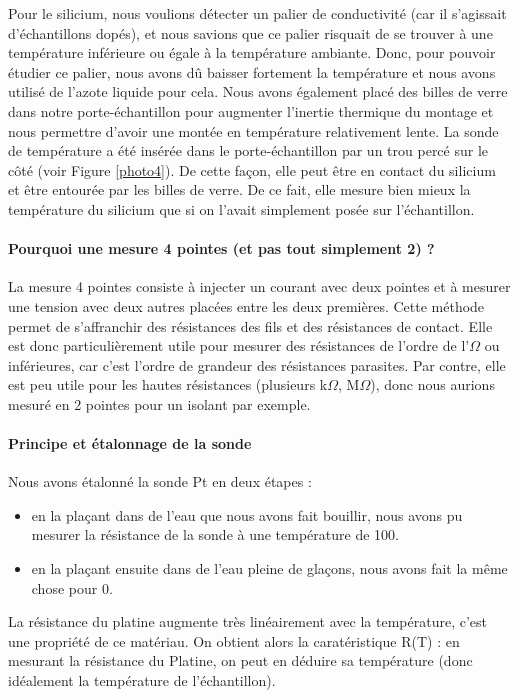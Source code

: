 Pour le silicium, nous voulions détecter un palier de conductivité (car il s'agissait d'échantillons dopés), et nous savions que ce palier risquait de se trouver à une température inférieure ou égale à la température ambiante.
Donc, pour pouvoir étudier ce palier, nous avons dû baisser fortement la température et nous avons utilisé de l'azote liquide pour cela.
Nous avons également placé des billes de verre dans notre porte-échantillon pour augmenter l'inertie thermique du montage et nous permettre d'avoir une montée en température relativement lente.
La sonde de température a été insérée dans le porte-échantillon par un trou percé sur le côté (voir Figure \ref{photo4}). De cette façon, elle peut être en contact du silicium et être entourée par les billes de verre.
De ce fait, elle mesure bien mieux la température du silicium que si on l'avait simplement posée sur l'échantillon.


\paragraph{Pourquoi une mesure 4 pointes (et pas tout simplement 2) ?}
La mesure 4 pointes consiste à injecter un courant avec deux pointes et à mesurer une tension avec deux autres placées entre les deux premières.
Cette méthode permet de s'affranchir des résistances des fils et des résistances de contact.
Elle est donc particulièrement utile pour mesurer des résistances de l'ordre de l'$\Omega$ ou inférieures, car c'est l'ordre de grandeur des résistances parasites.
Par contre, elle est peu utile pour les hautes résistances (plusieurs k$\Omega$, M$\Omega$), donc nous aurions mesuré en 2 pointes pour un isolant par exemple.


\paragraph{Principe et étalonnage de la sonde}
Nous avons étalonné la sonde Pt en deux étapes :

\begin{itemize}
  \item en la plaçant dans de l'eau que nous avons fait bouillir, nous avons pu mesurer la résistance de la sonde à une température de 100\celsius{}.
  \item en la plaçant ensuite dans de l'eau pleine de glaçons, nous avons fait la même chose pour 0\celsius{}.
\end{itemize}

La résistance du platine augmente très linéairement avec la température, c'est une propriété de ce matériau.
On obtient alors la caratéristique R(T) : en mesurant la résistance du Platine, on peut en déduire sa température (donc idéalement la température de l'échantillon).


